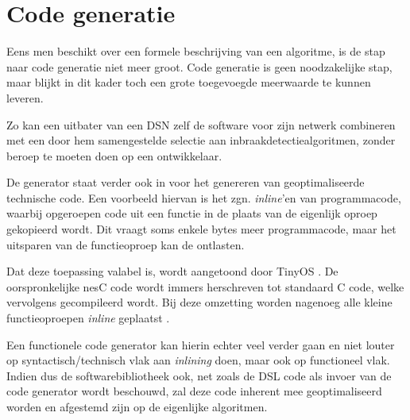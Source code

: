 \section{Code generatie}
\label{section:solution-codegen}

Eens men beschikt over een formele beschrijving van een algoritme, is de stap
naar code generatie niet meer groot. Code generatie is geen noodzakelijke stap,
maar blijkt in dit kader toch een grote toegevoegde meerwaarde te kunnen
leveren.

Zo kan een uitbater van een DSN zelf de software voor zijn netwerk combineren
met een door hem samengestelde selectie aan inbraakdetectiealgoritmen, zonder
beroep te moeten doen op een ontwikkelaar.

De generator staat verder ook in voor het genereren van geoptimaliseerde
technische code. Een voorbeeld hiervan is het zgn. \emph{inline}'en van
programmacode, waarbij opgeroepen code uit een functie in de plaats van de
eigenlijk oproep gekopieerd wordt. Dit vraagt soms enkele bytes meer
programmacode, maar het uitsparen van de functieoproep kan de \mcu ontlasten.

Dat deze toepassing valabel is, wordt aangetoond door TinyOS
\citep{levis2005tinyos}. De oorspronkelijke nesC code wordt immers herschreven
tot standaard C code, welke vervolgens gecompileerd wordt. Bij deze omzetting
worden nagenoeg alle kleine functieoproepen \emph{inline} geplaatst
\citep{gay2007software}.

Een functionele code generator kan hierin echter veel verder gaan en niet
louter op syntactisch/technisch vlak aan \emph{inlining} doen, maar ook op
functioneel vlak. Indien dus de softwarebibliotheek ook, net zoals de DSL code
als invoer van de code generator wordt beschouwd, zal deze code inherent mee
geoptimaliseerd worden en afgestemd zijn op de eigenlijke algoritmen.
